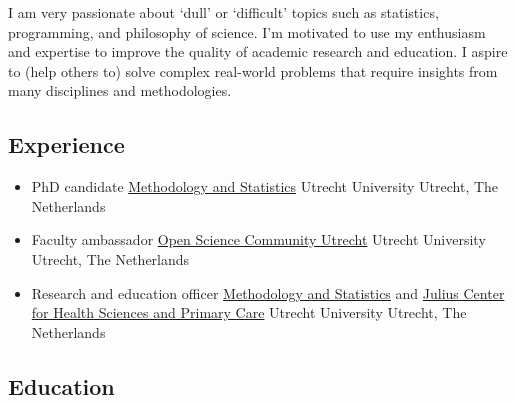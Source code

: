 \documentclass[
  letterpaper,
  DIV=11,
  numbers=noendperiod,
  oneside]{scrartcl}
\providecommand{\tightlist}{%
  \setlength{\itemsep}{0pt}\setlength{\parskip}{0pt}}\usepackage{longtable,booktabs,array}
\begin{document}
I am very passionate about `dull' or `difficult' topics such as
statistics, programming, and philosophy of science. I'm motivated to use
my enthusiasm and expertise to improve the quality of academic research
and education. I aspire to (help others to) solve complex real-world
problems that require insights from many disciplines and methodologies.

\hypertarget{experience}{%
\subsection{Experience}\label{experience}}

{}

\begin{itemize}
\tightlist
\item
  PhD candidate
  \href{https://www.uu.nl/en/organisation/methodology-and-statistics}{Methodology
  and Statistics} \textbar{} Utrecht University \textbar{} Utrecht, The
  Netherlands
\end{itemize}

{}

\begin{itemize}
\tightlist
\item
  Faculty ambassador \href{https://openscience-utrecht.com/}{Open
  Science Community Utrecht} \textbar{} Utrecht University \textbar{}
  Utrecht, The Netherlands
\end{itemize}

{}

\begin{itemize}
\tightlist
\item
  Research and education officer
  \href{https://www.uu.nl/en/organisation/methodology-and-statistics}{Methodology
  and Statistics} and
  \href{https://juliuscentrum.umcutrecht.nl/en/}{Julius Center for
  Health Sciences and Primary Care} \textbar{} Utrecht University
  \textbar{} Utrecht, The Netherlands
\end{itemize}

\hypertarget{education}{%
\subsection{Education}\label{education}}
\end{document}
